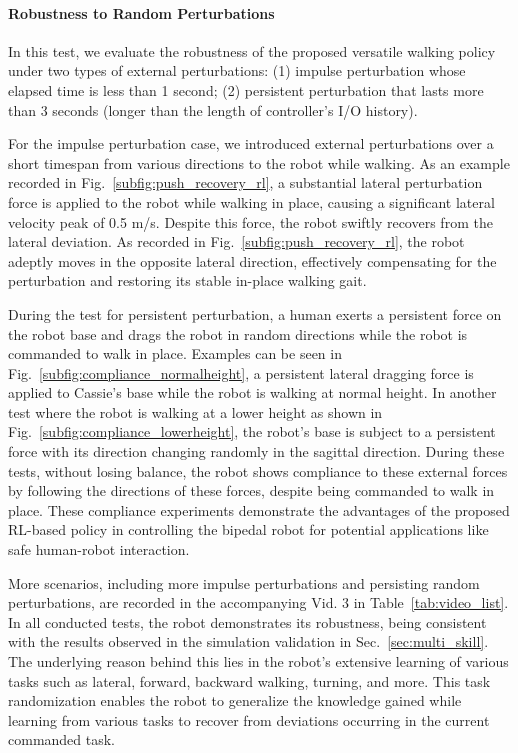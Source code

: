 \paragraph{Robustness to Random Perturbations}
In this test, we evaluate the robustness of the proposed versatile walking policy under two types of external perturbations: (1) impulse perturbation whose elapsed time is less than 1 second; (2) persistent perturbation that lasts more than 3 seconds (longer than the length of controller's I/O history). 

For the impulse perturbation case, we introduced external perturbations over a short timespan from various directions to the robot while walking. 
As an example recorded in Fig.~\ref{subfig:push_recovery_rl}, a substantial lateral perturbation force is applied to the robot while walking in place, causing a significant lateral velocity peak of 0.5 m/s. 
Despite this force, the robot swiftly recovers from the lateral deviation. 
As recorded in Fig.~\ref{subfig:push_recovery_rl}, the robot adeptly moves in the opposite lateral direction, effectively compensating for the perturbation and restoring its stable in-place walking gait.





During the test for persistent perturbation, a human exerts a persistent force on the robot base and drags the robot in random directions while the robot is commanded to walk in place.  
Examples can be seen in Fig.~\ref{subfig:compliance_normalheight}, a persistent lateral dragging force is applied to Cassie's base while the robot is walking at normal height. 
In another test where the robot is walking at a lower height as shown in Fig.~\ref{subfig:compliance_lowerheight}, the robot's base is subject to a persistent force with its direction changing randomly in the sagittal direction. 
During these tests, without losing balance, the robot shows compliance to these external forces by following the directions of these forces, despite being commanded to walk in place. 
These compliance experiments demonstrate the advantages of the proposed RL-based policy in controlling the bipedal robot for potential applications like safe human-robot interaction.

More scenarios, including more impulse perturbations and persisting random perturbations, are recorded in the accompanying Vid. 3 in Table~\ref{tab:video_list}.
In all conducted tests, the robot demonstrates its robustness, being consistent with the results observed in the simulation validation in Sec.~\ref{sec:multi_skill}.
The underlying reason behind this lies in the robot's extensive learning of various tasks such as lateral, forward, backward walking, turning, and more.
This task randomization enables the robot to generalize the knowledge gained while learning from various tasks to recover from deviations occurring in the current commanded task.



